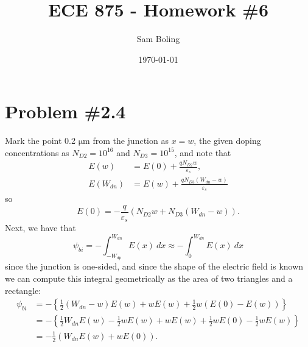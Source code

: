 \documentclass{article}
\title{ECE 875 - Homework \#6}
\author{Sam Boling}
\date{\today}
\begin{document}
\maketitle

\section*{Problem \#2.4}

Mark the point 0.2 $\mathrm{\mu m}$ from the junction as $x = w$, the given 
doping concentrations as $N_{D2} = 10^{16}$ and $N_{D3} = 10^{15}$, and note that
\begin{align*}
E(w)      &= E(0) + \frac{q N_{D2} w}{\varepsilon_s}, \\
E(W_{dn}) &= E(w) + \frac{q N_{D3} (W_{dn} - w)}{\varepsilon_s}
\end{align*}
so
$$
E(0) = -\frac{q}{\varepsilon_s}(N_{D2} w + N_{D3} (W_{dn} - w)).
$$
Next, we have that
$$
\psi_{bi} = -\int_{-W_{dp}}^{W_{dn}} E(x) ~dx 
          \approx -\int_{0}^{W_{dn}} E(x) ~dx
$$
since the junction is one-sided, and since the shape of the electric field is
known we can compute this integral geometrically as the area of two triangles
and a rectangle:
\begin{align*}
\psi_{bi} &= -\left\{\frac{1}{2}(W_{dn} - w)E(w) 
                  + w E(w) 
                  + \frac{1}{2} w (E(0) - E(w))\right\} \\
          &= -\left\{\frac{1}{2} W_{dn} E(w) 
                  - \frac{1}{2} w E(w) 
                  + w E(w) 
                  + \frac{1}{2} w E(0)
                  - \frac{1}{2} w E(w)\right\} \\
          &= -\frac{1}{2}(W_{dn} E(w) + w E(0)).
\end{align*}
\end{document}

